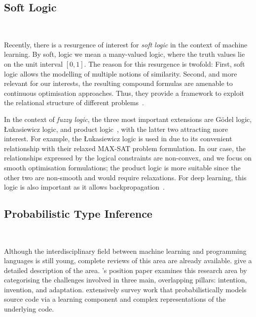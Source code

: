 \documentclass[acmsmall, review, anonymous]{acmart}\settopmatter{printfolios=true,printccs=false,printacmref=false}
\begin{document}
 
\subsection{Soft Logic}~\label{ssec:softlogic}

Recently, there is a resurgence of interest for \textit{soft logic} in the context of machine learning. By soft, logic we mean a many-valued logic, where the truth values lie on the unit interval $[0,1]$. The 
reason for this resurgence is twofold: First,
soft logic allows the modelling of multiple notions
of similarity. Second, and more relevant for our
interests, the resulting compound formulas are 
amenable to continuous optimisation approaches. Thus, they provide a framework to exploit the relational structure of different problems~\cite{kimmig12}.

In the context of \textit{fuzzy logic}, the three most
important extensions are G{\"o}del logic, {\L}ukasiewicz logic, and product logic~\cite{hajek98}, with the latter two attracting more interest. For example, the {\L}ukasiewicz logic is used in \citet{bach17} due 
to its convenient relationship with their relaxed MAX-SAT problem formulation. In our case, the relationships expressed by the logical constraints are non-convex, and we focus on smooth optimisation formulations; the product logic is more
suitable since the other two are non-smooth and 
would require relaxations. For 
deep learning, this logic is also important as it 
allows backpropagation~\cite{evans18}.

\subsection{Probabilistic Type Inference}~\label{sec:ml:over:source}

Although the interdisciplinary field between machine learning and programming
languages is still young, complete reviews of this area are
already available.
\citet{vechev16} give a detailed description of the area.
\citet{threepillars}'s position paper examines this research area by categorising
the challenges involved in three main, overlapping pillars: intention, invention, and adaptation.
\citet{allamanis17} extensively survey work that probabilistically models source code via a learning component and complex representations of the underlying code.
\end{document}
